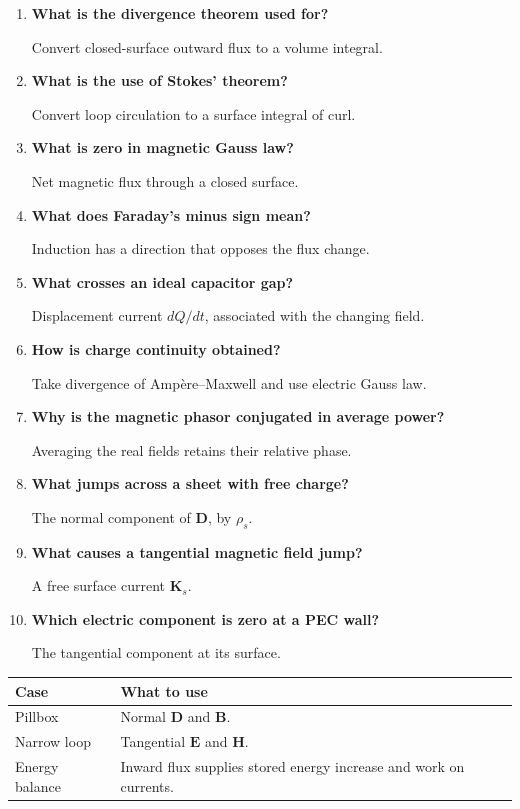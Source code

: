 \documentclass[12pt,a4paper]{article}
\newcommand{\Q}[1]{\textbf{#1}\par\noindent\ignorespaces}
\begin{document}
\begin{tcolorbox}[exambox,title={Frequently Asked / Viva Questions}]
\begin{enumerate}[topsep=0pt, label=\textbf{Q\arabic*.}, itemsep=5pt]
\item \Q{What is the divergence theorem used for?}
Convert closed-surface outward flux to a volume integral.
\item \Q{What is the use of Stokes' theorem?}
Convert loop circulation to a surface integral of curl.
\item \Q{What is zero in magnetic Gauss law?}
Net magnetic flux through a closed surface.
\item \Q{What does Faraday's minus sign mean?}
Induction has a direction that opposes the flux change.
\item \Q{What crosses an ideal capacitor gap?}
Displacement current $dQ/dt$, associated with the changing field.
\item \Q{How is charge continuity obtained?}
Take divergence of Amp\`ere--Maxwell and use electric Gauss law.
\item \Q{Why is the magnetic phasor conjugated in average power?}
Averaging the real fields retains their relative phase.
\item \Q{What jumps across a sheet with free charge?}
The normal component of $\mathbf D$, by $\rho_s$.
\item \Q{What causes a tangential magnetic field jump?}
A free surface current $\mathbf K_s$.
\item \Q{Which electric component is zero at a PEC wall?}
The tangential component at its surface.
\end{enumerate}
\end{tcolorbox}
\begin{tcolorbox}[tikzbox,title={Summary comparison}]
\begin{tabularx}{\linewidth}{|B{4cm}|Y|}\hline
\textbf{Case} & \textbf{What to use} \\ \hline
Pillbox & Normal $\mathbf D$ and $\mathbf B$. \\ \hline
Narrow loop & Tangential $\mathbf E$ and $\mathbf H$. \\ \hline
Energy balance & Inward flux supplies stored energy increase and work on currents. \\ \hline
\end{tabularx}
\end{tcolorbox}
\end{document}
